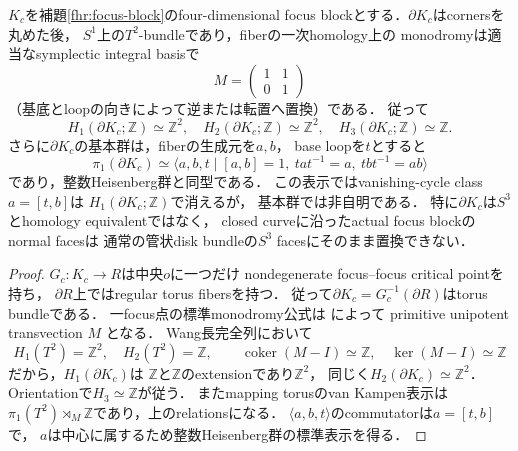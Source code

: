 \begin{proposition}
\label{tnc:focus-boundary-homology}
$K_c$を補題\ref{fhr:focus-block}のfour-dimensional
focus blockとする．$\partial K_c$はcornersを丸めた後，
$S^1$上の$T^2$-bundleであり，fiberの一次homology上の
monodromyは適当なsymplectic integral basisで
\[
 M=\begin{pmatrix}1&1\\0&1\end{pmatrix}
\]
（基底とloopの向きによって逆または転置へ置換）である．
従って
\[
 H_1(\partial K_c;\mathbb Z)\simeq\mathbb Z^2,\quad
 H_2(\partial K_c;\mathbb Z)\simeq\mathbb Z^2,\quad
 H_3(\partial K_c;\mathbb Z)\simeq\mathbb Z.
\]
さらに$\partial K_c$の基本群は，fiberの生成元を$a,b$，
base loopを$t$とすると
\[
 \pi_1(\partial K_c)
 \simeq\langle a,b,t\mid[a,b]=1,\ 
            tat^{-1}=a,\ tbt^{-1}=ab\rangle
\]
であり，整数Heisenberg群と同型である．
この表示ではvanishing-cycle class $a=[t,b]$は
$H_1(\partial K_c;\mathbb Z)$で消えるが，
基本群では非自明である．
特に$\partial K_c$は$S^3$とhomology equivalentではなく，
closed curveに沿ったactual focus blockのnormal facesは
通常の管状disk bundleの$S^3$ facesにそのまま置換できない．
\end{proposition}
\begin{proof}
$G_c:K_c\to R$は中央$o$に一つだけ
nondegenerate focus--focus critical pointを持ち，
$\partial R$上ではregular torus fibersを持つ．
従って$\partial K_c=G_c^{-1}(\partial R)$はtorus bundleである．
一focus点の標準monodromy公式は
\cite[Section~3]{zung-focus-cf}によって
primitive unipotent transvection $M$ となる．
Wang長完全列において
\[
 H_1(T^2)=\mathbb Z^2,\quad H_2(T^2)=\mathbb Z,\qquad
 \operatorname{coker}(M-I)\simeq\mathbb Z,\quad
 \ker(M-I)\simeq\mathbb Z
\]
だから，$H_1(\partial K_c)$は
$\mathbb Z$と$\mathbb Z$のextensionであり$\mathbb Z^2$，
同じく$H_2(\partial K_c)\simeq\mathbb Z^2$．
Orientationで$H_3\simeq\mathbb Z$が従う．
またmapping torusのvan Kampen表示は
$\pi_1(T^2)\rtimes_M\mathbb Z$であり，上のrelationsになる．
$\langle a,b,t\rangle$のcommutatorは$a=[t,b]$で，
$a$は中心に属するため整数Heisenberg群の標準表示を得る．
\end{proof}

